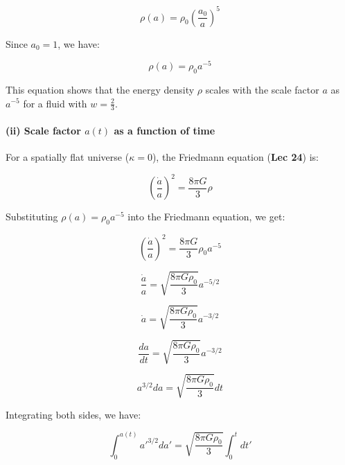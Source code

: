 \documentclass{article}
\begin{document}
\begin{equation}
\rho(a) = \rho_0 \left(\frac{a_0}{a}\right)^5
\end{equation}

Since $a_0 = 1$, we have:

\begin{equation}
\rho(a) = \rho_0 a^{-5}
\end{equation}

This equation shows that the energy density $\rho$ scales with the scale factor $a$ as $a^{-5}$ for a fluid with $w = \frac{2}{3}$.

\paragraph{(ii) Scale factor $a(t)$ as a function of time}

For a spatially flat universe ($\kappa = 0$), the Friedmann equation (\textbf{Lec 24}) is:

\begin{equation} \label{eq:friedmann}
\left(\frac{\dot{a}}{a}\right)^2 = \frac{8\pi G}{3}\rho
\end{equation}

Substituting $\rho(a) = \rho_0 a^{-5}$ into the Friedmann equation, we get:

\begin{equation}
\left(\frac{\dot{a}}{a}\right)^2 = \frac{8\pi G}{3} \rho_0 a^{-5}
\end{equation}

\begin{equation}
\frac{\dot{a}}{a} = \sqrt{\frac{8\pi G \rho_0}{3}} a^{-5/2}
\end{equation}

\begin{equation}
\dot{a} = \sqrt{\frac{8\pi G \rho_0}{3}} a^{-3/2}
\end{equation}

\begin{equation}
\frac{da}{dt} = \sqrt{\frac{8\pi G \rho_0}{3}} a^{-3/2}
\end{equation}

\begin{equation}
a^{3/2} da = \sqrt{\frac{8\pi G \rho_0}{3}} dt
\end{equation}

Integrating both sides, we have:

\begin{equation}
\int_{0}^{a(t)} a'^{3/2} da' = \sqrt{\frac{8\pi G \rho_0}{3}} \int_{0}^{t} dt'
\end{equation}
\end{document}
